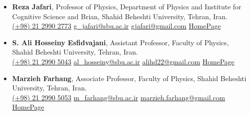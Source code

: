 \documentclass[12pt, b4paper]{cv}
\begin{document}
\begin{itemize}[leftmargin=*]
	\item \textbf{Reza Jafari}, Professor of Physics, Department of Physics and Institute for Cognitive Science and Brian, Shahid Beheshti University, Tehran, Iran.\\
	\href{tel:(+98)2129902773}{ (+98) 21 2990 2773}
	\hspace{0.5in}
	\href{mailto:g\_jafari@sbu.ac.ir}{ g\_jafari@sbu.ac.ir}
	\hspace{0.75in}
	\href{mailto:gjafari@gmail.com}{ gjafari@gmail.com}
	\hspace{1.14in}
	\href{https://complexity.sbu.ac.ir/professor-reza-jafari/}{HomePage} 
	\item \textbf{S. Ali Hosseiny Esfidvajani}, Assistant Professor, Faculty of Physics, Shahid Beheshti University, Tehran, Iran.\\
	\href{tel:(+98)2129905043}{ (+98) 21 2990 5043}
	\hspace{0.5in}
	\href{mailto:al\_hosseiny@sbu.ac.ir}{ al\_hosseiny@sbu.ac.ir}
	\hspace{0.5in}
	\href{mailto:alihd22@gmail.com}{ alihd22@gmail.com}
	\hspace{1.091in}
	\href{https://alihosseiny.com/}{HomePage} 
	\item \textbf{Marzieh Farhang}, Associate Professor, Faculty of Physics, Shahid Beheshti University, Tehran, Iran.\\
	\href{tel:(+98)2129905053}{ (+98) 21 2990 5053}
	\hspace{0.5in}
	\href{mailto:m\_farhang@sbu.ac.ir}{ m\_farhang@sbu.ac.ir}
	\hspace{0.54in}
	\href{mailto:marzieh.farhang@gmail.com}{ marzieh.farhang@gmail.com}
	\hspace{0.5in}
	\href{https://en.sbu.ac.ir/~m_farhang/home}{HomePage} 
\end{itemize}
\end{document}
